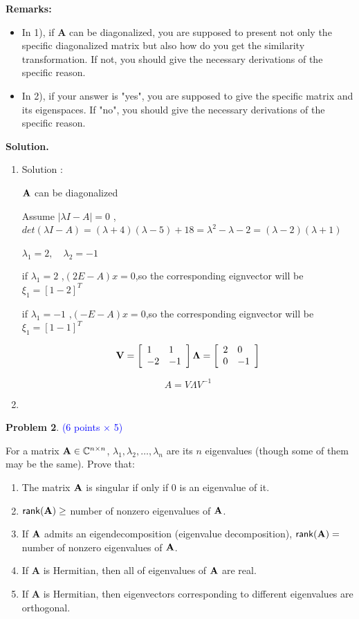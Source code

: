 \documentclass[english,onecolumn]{IEEEtran}
\newcommand{\bA}{{\bf A}}
\def\A{\mathbf{A}}
\begin{document}
{\bf Remarks:} 
\begin{itemize}
    \item In 1), if {\bf A} can be diagonalized, you are supposed to present not only the specific diagonalized matrix but also how do you get the similarity transformation.
    If not, you should give the necessary derivations of the specific reason.
    \item In 2), if your answer is "yes", you are supposed to give the specific matrix and its eigenspaces.
    If "no", you should give the necessary derivations of the specific reason.
\end{itemize}

\noindent
\textbf{Solution.}
\begin{enumerate}
    \item 
    Solution :
    
    $\bA$ can be diagonalized
    
    Assume $|\lambda I - A| = 0$ , $det(\lambda I - A)=(\lambda +4)(\lambda-5)+18 = \lambda^2-\lambda-2=(\lambda-2)(\lambda+1)$
    
    $\lambda_1 = 2,\quad \lambda_2 = -1$
    
    if $\lambda_1 =2$ ,$(2E-A)x = 0$,so the corresponding eignvector will be $\xi_1 = [1 -2]^T$
    
    if $\lambda_1 =-1$ ,$(-E-A)x = 0$,so the corresponding eignvector will be $\xi_1 = [1 -1]^T$
    
    $$
     {\bf V} = \left[\begin{array}{ll}
    	 1 & 1 \\
    	-2 & -1
    \end{array}\right]   
	 {\bf \Lambda} = \left[\begin{array}{ll}
		2 & 0\\
		0 & -1
	\end{array}\right]
$$

$$A = V \Lambda V^{-1}$$

    \item 
\end{enumerate}


\newpage
\noindent\textbf{Problem 2}. \textcolor{blue}{(6 points $\times$ 5)}

\noindent
For a matrix ${\bf A}\in \mathbb{C}^{n\times n}$, 
$\lambda_1, \lambda_2, \ldots, \lambda_n$   are its $n$ eigenvalues 
(though some of them may be the same). 
Prove that:
\begin{enumerate}
    \item The matrix ${\bf A}$ is singular if only if 0 is an eigenvalue of it.
    \item ${\sf rank}({\bf A}) \geq$ number of nonzero eigenvalues of ${\bf A}$.
    \item If ${\bf A}$ admits an  eigendecomposition (eigenvalue decomposition), ${\sf rank}({\bf A}) =$ number of nonzero eigenvalues of ${\bf A}$.
    \item If $\A$ is Hermitian, then all of eigenvalues of $\bA$ are real.
    \item If $\A$ is Hermitian, then eigenvectors corresponding to different eigenvalues are orthogonal.
\end{enumerate}
\end{document}
